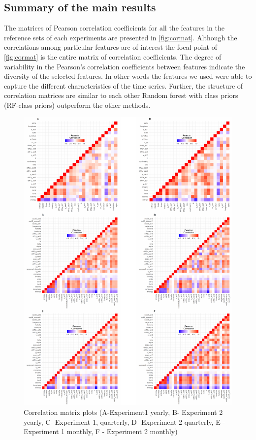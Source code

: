 \documentclass[11pt,a4paper,]{article}
\theoremstyle{definition}
\theoremstyle{definition}
\theoremstyle{definition}
\theoremstyle{remark}
\begin{document}
\subsection{Summary of the main results}\label{sec:results}

The matrices of Pearson correlation coefficients for all the features in
the reference sets of each experiments are presented in
\autoref{fig:cormat}. Although the correlations among particular
features are of interest the focal point of \autoref{fig:cormat} is the
entire matrix of correlation coefficients. The degree of variability in
the Pearson's correlation coefficients between features indicate the
diversity of the selected features. In other words the features we used
were able to capture the different characteristics of the time series.
Further, the structure of correlation matrices are similar to each other
Random forest with class priors (RF-class priors) outperform the other
methods.

\begin{figure}

{\centering \includegraphics[width=\textwidth]{figure/cormat-1} 

}

\caption{ Correlation matrix plots (A-Experiment1 yearly, B- Experiment 2 yearly, C- Experiment 1, quarterly, D- Experiment 2 quarterly, E - Experiment 1 monthly, F - Experiment 2 monthly)}\label{fig:cormat}
\end{figure}
\end{document}

